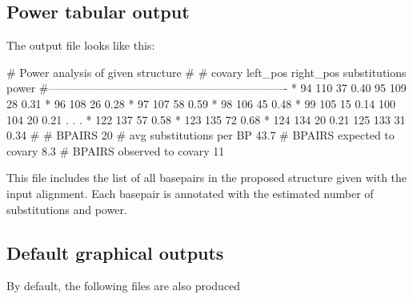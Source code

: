 \subsection{Power tabular output}
The output file  looks like this:\\

\begin{sreoutput}
# Power analysis of given structure 
#
# covary  left_pos      right_pos    substitutions      power
#----------------------------------------------------------------
     *    94            110             37              0.40
          95            109             28              0.31
     *    96            108             26              0.28
     *    97            107             58              0.59
     *    98            106             45              0.48
     *    99            105             15              0.14
          100           104             20              0.21
.
.
.
     *    122           137             57              0.58
     *    123           135             72              0.68
     *    124           134             20              0.21
          125           133             31              0.34
#
# BPAIRS 20
# avg substitutions per BP  43.7
# BPAIRS expected to covary 8.3
# BPAIRS observed to covary 11
\end{sreoutput}
%
This file includes the list of all basepairs in the proposed structure
given with the input alignment. Each basepair is annotated with the
estimated number of substitutions and power.

\subsection{Default graphical outputs}
By default, the following files are also produced

